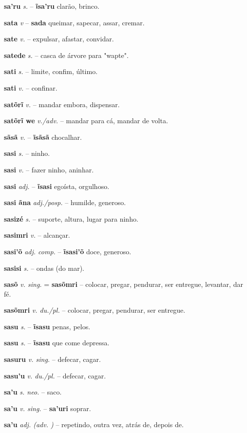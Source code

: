 \textbf{sa'ru} \textit{s.} -- \textbf{ĩsa'ru} clarão, brinco.

\textbf{sata} \textit{v} -- \textbf{sada} queimar, sapecar, assar, cremar.

\textbf{sate} \textit{v.} -- expulsar, afastar, convidar.

\textbf{satede} \textit{s.} -- casca de árvore para "wapte".

\textbf{sati} \textit{s.} -- limite, confim, último.

\textbf{sati} \textit{v.} -- confinar.

\textbf{satõrĩ} \textit{v.} -- mandar embora, dispensar.

\textbf{satõrĩ we} \textit{v./adv.} -- mandar para cá, mandar de volta.

\textbf{sãsã} \textit{v.} -- \textbf{ĩsãsã} chocalhar.

\textbf{sasi} \textit{s.} -- ninho.

\textbf{sasi} \textit{v.} -- fazer ninho, aninhar.

\textbf{sasi} \textit{adj.} -- \textbf{ĩsasi} egoísta, orgulhoso.

\textbf{sasi ãna} \textit{adj./posp.} -- humilde, generoso.

\textbf{sasizé} \textit{s.} -- suporte, altura, lugar para ninho.

\textbf{sasimri} \textit{v.} -- alcançar.

\textbf{sasi'õ} \textit{adj. comp.} -- \textbf{ĩsasi'õ} doce, generoso.

\textbf{sasisi} \textit{s.} -- ondas (do mar).

\textbf{sasõ} \textit{v. sing.} = \textbf{sasõmri} -- colocar, pregar, pendurar, ser entregue, levantar, dar fé.

\textbf{sasõmri} \textit{v. du./pl.} -- colocar, pregar, pendurar, ser entregue.

\textbf{sasu} \textit{s.} -- \textbf{ĩsasu} penas, pelos.

\textbf{sasu} \textit{s.} -- \textbf{ĩsasu} que come depressa.

\textbf{sasuru} \textit{v. sing.} -- defecar, cagar.

\textbf{sasu'u} \textit{v. du./pl.} -- defecar, cagar.

\textbf{sa'u} \textit{s. neo.} -- saco.

\textbf{sa'u} \textit{v. sing.} -- \textbf{sa'uri} soprar.

\textbf{sa'u} \textit{adj. (adv. )} -- repetindo, outra vez, atrás de, depois de.

